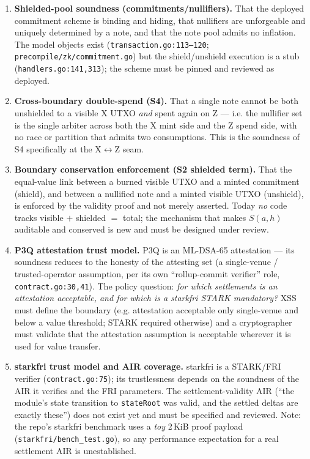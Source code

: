 \begin{enumerate}[leftmargin=2em]
\item \textbf{Shielded-pool soundness (commitments/nullifiers).} That
  the deployed commitment scheme is binding and hiding, that nullifiers
  are unforgeable and uniquely determined by a note, and that the note
  pool admits no inflation. The model objects exist
  (\texttt{transaction.go:113--120};
  \texttt{precompile/zk/commitment.go}) but the shield/unshield
  execution is a stub (\texttt{handlers.go:141,313}); the scheme must be
  pinned and reviewed as deployed.
\item \textbf{Cross-boundary double-spend (S4).} That a single note
  cannot be both unshielded to a visible X UTXO \emph{and} spent again
  on Z --- i.e. the nullifier set is the single arbiter across both the
  X mint side and the Z spend side, with no race or partition that
  admits two consumptions. This is the soundness of S4 specifically at
  the X$\leftrightarrow$Z seam.
\item \textbf{Boundary conservation enforcement (S2 shielded term).}
  That the equal-value link between a burned visible UTXO and a minted
  commitment (shield), and between a nullified note and a minted visible
  UTXO (unshield), is enforced by the validity proof and not merely
  asserted. Today \emph{no} code tracks visible $+$ shielded $=$ total;
  the mechanism that makes $S(a,h)$ auditable and conserved is new and
  must be designed under review.
\item \textbf{P3Q attestation trust model.} P3Q is an ML-DSA-65
  attestation --- its soundness reduces to the honesty of the attesting
  set (a single-venue / trusted-operator assumption, per its own
  ``rollup-commit verifier'' role, \texttt{contract.go:30,41}). The
  policy question: \emph{for which settlements is an attestation
  acceptable, and for which is a starkfri STARK mandatory?} XSS must
  define the boundary (e.g. attestation acceptable only single-venue and
  below a value threshold; STARK required otherwise) and a cryptographer
  must validate that the attestation assumption is acceptable wherever
  it is used for value transfer.
\item \textbf{starkfri trust model and AIR coverage.} starkfri is a
  STARK/FRI verifier (\texttt{contract.go:75}); its trustlessness
  depends on the soundness of the AIR it verifies and the FRI parameters.
  The settlement-validity AIR (``the module's state transition to
  \texttt{stateRoot} was valid, and the settled deltas are exactly
  these'') does not exist yet and must be specified and reviewed. Note:
  the repo's starkfri benchmark uses a \emph{toy} 2\,KiB proof payload
  (\texttt{starkfri/bench\_test.go}), so any performance expectation for
  a real settlement AIR is unestablished.
\end{enumerate}

